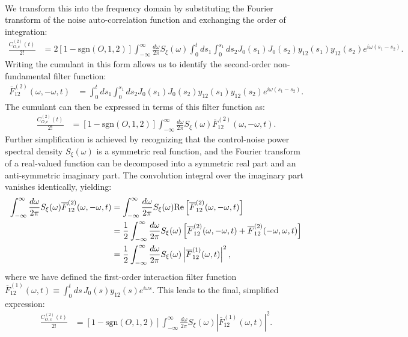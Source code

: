 \documentclass[%
 reprint,
superscriptaddress,
 amsmath,amssymb,
 aps,
pra,
floatfix,
]{revtex4-2}
\begin{document}
\begin{widetext}
\begin{align}
\end{align}
We transform this into the frequency domain by substituting the Fourier transform of the noise auto-correlation function and exchanging the order of integration:
\begin{align}
    \frac{C_{O,c}^{(2)}(t)}{2!}&=2[1-\text{sgn}(O,1,2)]\int_{-\infty}^\infty\frac{d\omega}{2\pi}S_\xi(\omega) \int_0^t ds_1\int_0^{s_1}ds_2 J_0(s_1)J_0(s_2)y_{12}(s_1)y_{12}(s_2)e^{i\omega (s_1-s_2)}.
\end{align}
Writing the cumulant in this form allows us to identify the second-order non-fundamental filter function:
\begin{align}
    \overline{F}^{(2)}_{12}(\omega, -\omega, t)&=\int_0^t ds_1\int_0^{s_1}ds_2 J_0(s_1)J_0(s_2)y_{12}(s_1)y_{12}(s_2)e^{i\omega(s_1-s_2)}.
\end{align}
The cumulant can then be expressed in terms of this filter function as:
\begin{align}
    \frac{C_{O,c}^{(2)}(t)}{2!}&=[1-\text{sgn}(O,1,2)]\int_{-\infty}^\infty\frac{d\omega}{2\pi}S_\xi(\omega)\overline{F}^{(2)}_{12}(\omega, -\omega, t).
\end{align}
Further simplification is achieved by recognizing that the control-noise power spectral density $S_\xi(\omega)$ is a symmetric real function, and the Fourier transform of a real-valued function can be decomposed into a symmetric real part and an anti-symmetric imaginary part. The convolution integral over the imaginary part vanishes identically, yielding:
\begin{align}
    \int_{-\infty}^\infty\frac{d\omega}{2\pi}S_\xi(\omega)\overline{F}^{(2)}_{12}(\omega, -\omega, t) &= \int_{-\infty}^\infty\frac{d\omega}{2\pi}S_\xi(\omega)\text{Re}\left[\overline{F}^{(2)}_{12}(\omega, -\omega, t)\right] \notag\\
    &= \frac{1}{2} \int_{-\infty}^\infty\frac{d\omega}{2\pi}S_\xi(\omega)\left[\overline{F}^{(2)}_{12}(\omega, -\omega, t) + \overline{F}^{(2)}_{12}(-\omega, \omega, t)\right] \notag\\
    &= \frac{1}{2} \int_{-\infty}^\infty\frac{d\omega}{2\pi}S_\xi(\omega)\left|\overline{F}^{(1)}_{12}(\omega, t)\right|^2,
\end{align}
where we have defined the first-order interaction filter function $\overline{F}^{(1)}_{12}(\omega, t) \equiv \int_0^t ds\, J_0(s) y_{12}(s) e^{i\omega s}$. This leads to the final, simplified expression:
\begin{align}
    \frac{C_{O,c}^{(2)}(t)}{2!}&=[1-\text{sgn}(O,1,2)]\int_{-\infty}^\infty\frac{d\omega}{2\pi}S_\xi(\omega)\left|\overline{F}^{(1)}_{12}(\omega, t)\right|^2.
\end{align}


\end{widetext}
\end{document}
